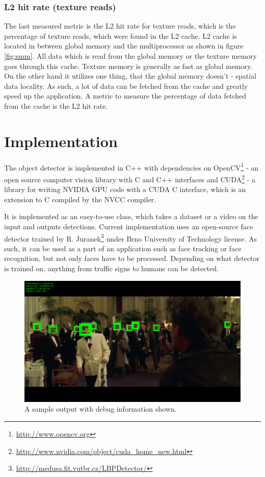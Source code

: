 \subsection{L2 hit rate (texture reads)} \label{subsec:metrics-l2-hit-rate-texture}

The last measured metric is the L2 hit rate for texture reads, which is the percentage of texture reads, which were found in the L2 cache. L2 cache is located in between global memory and the multiprocessor as shown in figure \ref{fig:smm}. All data which is read from the global memory or the texture memory goes through this cache. Texture memory is generally as fast as global memory. On the other hand it utilizes one thing, that the global memory doesn't - spatial data locality. As such, a lot of data can be fetched from the cache and greatly speed up the application. A metric to measure the percentage of data fetched from the cache is the L2 hit rate.

\chapter{Implementation}\label{ch:implementation}

The object detector is implemented in C++ with dependencies on OpenCV\footnote{\url{http://www.opencv.org}} - an open source computer vision library with C and C++ interfaces and CUDA\footnote{\url{http://www.nvidia.com/object/cuda_home_new.html}} - a library for writing NVIDIA GPU code with a CUDA C interface, which is an extension to C compiled by the NVCC compiler.

It is implemented as an easy-to-use class, which takes a dataset or a video on the input and outputs detections. Current implementation uses an open-source face detector trained by R. Juranek\footnote{\url{http://medusa.fit.vutbr.cz/LBPDetector/}} under Brno University of Technology license. As such, it can be used as a part of an application such as face tracking or face recognition, but not only faces have to be processed. Depending on what detector is trained on, anything from traffic signs to humans can be detected.

\begin{center}
\begin{figure}[ht]
	\centering\includegraphics[width=\textwidth]{fig/sample.jpg}
	\caption{A sample output with debug information shown.}
	\label{fig:sample}
\end{figure}
\end{center}

